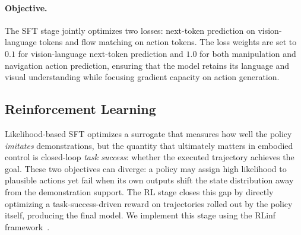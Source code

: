 \documentclass{llmxive}
\begin{document}
\paragraph{Objective.}
The SFT stage jointly optimizes two losses: next-token prediction on vision-language tokens and flow matching on action tokens. The loss weights are set to $0.1$ for vision-language next-token prediction and $1.0$ for both manipulation and navigation action prediction, ensuring that the model retains its language and visual understanding while focusing gradient capacity on action generation.


\subsection{Reinforcement Learning}
\label{sec:rl}

Likelihood-based SFT optimizes a surrogate that measures how well the policy \emph{imitates} demonstrations, but the quantity that ultimately matters in embodied control is closed-loop \emph{task success}: whether the executed trajectory achieves the goal.
These two objectives can diverge: a policy may assign high likelihood to plausible actions yet fail when its own outputs shift the state distribution away from the demonstration support.
The RL stage closes this gap by directly optimizing a task-success-driven reward on trajectories rolled out by the policy itself, producing the final model. We implement this stage using the RLinf framework~\citep{yu2025rlinf}.
\end{document}
